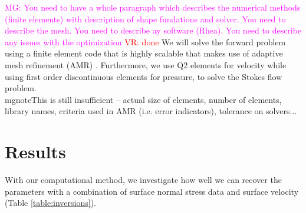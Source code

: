 \documentclass[12pt]{article}
\newcommand{\mgnote}[1]{\textcolor{magenta}{MG: #1}}
\newcommand{\vrnote}[1]{\textcolor{red}{VR: #1}}
\begin{document}
\mgnote{You need to have a whole paragraph which describes the numerical methods (finite elements) with description of shape fundations and solver. You need to describe the mesh. You need to describe ay software (Rhea). You need to describe any issues with the optimization} \vrnote{done}
We will solve the forward problem using a finite element code that is highly scalable that makes  use of adaptive mesh refinement (AMR) \citep{rudi2015extreme}. Furthermore, we use Q2 elements for velocity while using first order discontinuous elements for pressure, to solve the Stokes flow problem.
\\mgnote{This is still insufficient -- actual size of elements, number of elements, library names, criteria used in AMR (i.e. error indicators), tolerance on solvers...}


\section*{Results}
With our computational method, we investigate how well we can recover the parameters with a combination of surface normal stress data and surface velocity  (Table \ref{table:inversions}).
\end{document}
